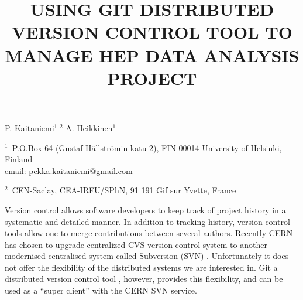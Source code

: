 \documentclass[12pt]{article}
\begin{document}
\title{USING GIT DISTRIBUTED VERSION CONTROL TOOL TO MANAGE HEP DATA ANALYSIS PROJECT}
\underline{P. Kaitaniemi}$^{1, 2}$ A. Heikkinen$^1$ 

$^1$~P.O.Box 64 (Gustaf H\"allstr\"omin katu 2), FIN-00014 University of Helsinki, Finland\\
email: pekka.kaitaniemi@gmail.com

$^2$~CEN-Saclay, CEA-IRFU/SPhN, 91 191 Gif sur Yvette, France
\vspace{\baselineskip}

Version control allows software developers to keep track of project history in
a systematic and detailed manner. 
In addition to tracking history, version control tools allow
one to merge contributions between several authors.
Recently CERN has chosen to upgrade centralized CVS version control
system to another modernised centralised system called Subversion (SVN) \cite{svnsite}.
Unfortunately it does not offer the flexibility of the
distributed systems we are interested in. 
Git a distributed version control tool \cite{torvalds}, however, 
provides this flexibility, 
and can be used as a ``super client'' with the CERN SVN service.

\end{document}
